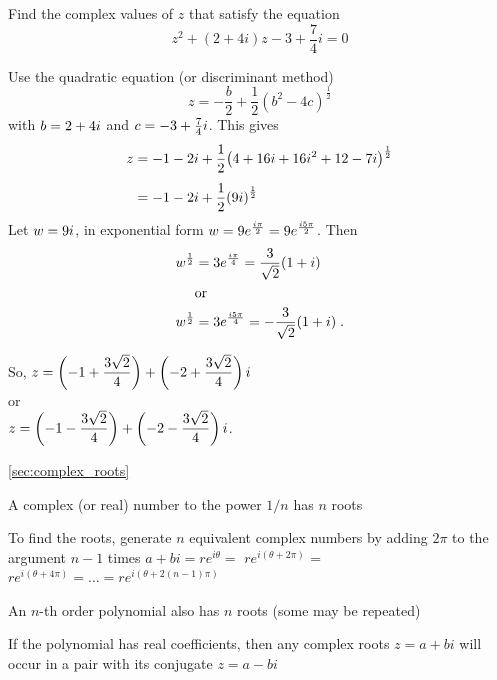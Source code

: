 \goodbreak
\begin{example}[Video]
\label{ex:543}
Find the complex values of $z$ that satisfy the equation
\[
{z}^{2}+\left(2+4i\right)z-3+\frac{7}{4}i=0
\]
\end{example}

\begin{solution}
Use the quadratic equation (or discriminant method)
\[
z=-\frac{b}{2}+\frac{1}{2}{\left({b}^{2}-4c\right)}^{\frac{1}{2}}
\]
with $b=2+4i$ and $c=-3+\frac{7}{4}i$. This gives
\begin{align*}
    z &=-1-2i+\frac{1}{2}{\left(4+16i+16{i}^{2}+12-7i\right)}^{\frac{1}{2}} \\[4pt]
    &= -1-2i+\frac{1}{2}{\left(9i\right)}^{\frac{1}{2}}
\end{align*}
Let $w=9i$, in exponential form $w=9{e}^{\frac{i\pi }{2}} =9{e}^{\frac{i5\pi }{2}}$. Then 
\begin{align*}
{w}^{\frac{1}{2}} &=3{e}^{\frac{i\pi }{4}} =\frac{3}{\sqrt{2}}(1+i) \\
&{\rm or} \\
{w}^{\frac{1}{2}}&=3{e}^{\frac{i5\pi }{4}} =-\frac{3}{\sqrt{2}}(1+i) \; .
\end{align*}

So, $\displaystyle z=\left(-1+\frac{3\sqrt{2}}{4}\right)+\left(-2+\frac{3\sqrt{2}}{4}\right)i$ \\
or \\
$\displaystyle z=\left(-1-\frac{3\sqrt{2}}{4}\right)+\left(-2-\frac{3\sqrt{2}}{4}\right)i$.
\end{solution}

\goodbreak
\begin{recap}{\ref{sec:complex_roots}}
\item A complex (or real) number to the power $1/n$ has $n$ roots
\item To find the roots, generate $n$ equivalent complex numbers by adding $2\pi $ to the argument $n-1$ times
$a+bi=r{e}^{i\theta }=$ $r{e}^{i(\theta +2\pi )}$ = $r{e}^{i(\theta +4\pi )}=\ldots =r{e}^{i(\theta +2(n-1)\pi )}$
\item An $n$-th order polynomial also has $n$ roots (some may be repeated)
\item If the polynomial has real coefficients, then any complex roots $z=a+bi$ will occur in a pair with its conjugate $z=a-bi$
\end{recap}

